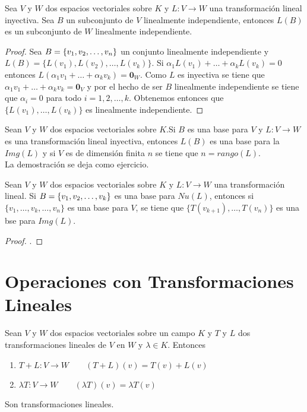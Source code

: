 \begin{theorem}
Sea $V$ y $W$ dos espacios vectoriales sobre $K$ y $L : V \to W$ una transformación lineal inyectiva. Sea $B$ un subconjunto de $V$ linealmente independiente, entonces $L(B)$ es un subconjunto de $W$ linealmente independiente. 
\end{theorem}

\begin{proof}
Sea $B =  \lbrace v_1, v_2, \ldots, v_n \rbrace$ un conjunto linealmente independiente y $L(B) = \{L(v_1), L(v_2), \ldots , L(v_k)\}$. Si $\alpha_1 L(v_1) + \ldots + \alpha_k L(v_k) = 0$ entonces $L(\alpha_1 v_1 + \ldots +\alpha_k v_k) = \mathbf{0}_W$. Como $L$ es inyectiva se tiene que $\alpha_1 v_1 + \ldots + \alpha_k v_k = \mathbf{0}_V$ y por el hecho de ser $B$ linealmente independiente se tiene que $\alpha_i = 0$ para todo $i = 1, 2, \ldots , k$. Obtenemos entonces que $\{L(v_1), \ldots , L(v_k)\}$ es linealmente independiente.
\end{proof}

\begin{theorem}
Sean $V$ y $W$ dos espacios vectoriales sobre $K$.Si $B$ es una base para $V$ y $L : V \to W$ es una transformación lineal inyectiva, entonces $L(B)$ es una base para la $Img(L)$ y si $V$ es de dimensión finita $n$ se tiene que $n = rango(L)$.\\

La demostración se deja como ejercicio. %
\end{theorem}

\begin{theorem}
Sean $V$ y $W$ dos espacios vectoriales sobre $K$ y $L : V \to W$ una transformación lineal. Si $B =  \lbrace v_1, v_2, \ldots, v_k \rbrace$ es una base para $Nu(L)$, entonces si $\{v_1 , \ldots , v_{k}, \ldots , v_n\}$ es una base para $V$, se tiene que $\{T(v_{k+1}), \ldots , T(v_n)\}$ es una bse para $Img(L)$.
\end{theorem}

\begin{proof}
.
\end{proof}

\section{Operaciones con Transformaciones Lineales}
\begin{dfn}
Sean $V$ y $W$ dos espacios vectoriales sobre un campo $K$ y $T$ y $L$ dos transformaciones lineales de $V$ en $W$ y $\lambda \in K$. Entonces 
\begin{enumerate}
\item $T + L : V \to W \qquad (T + L)(v) = T(v) + L(v)$
\item $\lambda T : V \to W \qquad (\lambda T)(v) = \lambda T(v)$
\end{enumerate}
Son transformaciones lineales.
\end{dfn}

